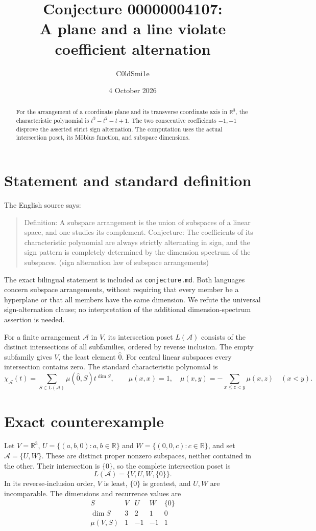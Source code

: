 \documentclass[11pt]{article}
\title{Conjecture 00000004107:\\A plane and a line violate coefficient alternation}
\author{C0ldSmi1e}
\date{4 October 2026}
\newcommand{\R}{\mathbb R}
\newcommand{\A}{\mathcal A}
\begin{document}
\maketitle
\begin{abstract}
For the arrangement of a coordinate plane and its transverse coordinate axis in $\R^3$, the characteristic polynomial is $t^3-t^2-t+1$. The two consecutive coefficients $-1,-1$ disprove the asserted strict sign alternation. The computation uses the actual intersection poset, its M\"obius function, and subspace dimensions.
\end{abstract}

\section{Statement and standard definition}
The English source says:
\begin{quote}
Definition: A subspace arrangement is the union of subspaces of a linear space, and one studies its complement. Conjecture: The coefficients of its characteristic polynomial are always strictly alternating in sign, and the sign pattern is completely determined by the dimension spectrum of the subspaces. (sign alternation law of subspace arrangements)
\end{quote}
The exact bilingual statement is included as \texttt{conjecture.md}. Both languages concern subspace arrangements, without requiring that every member be a hyperplane or that all members have the same dimension. We refute the universal sign-alternation clause; no interpretation of the additional dimension-spectrum assertion is needed.

For a finite arrangement $\A$ in $V$, its intersection poset $L(\A)$ consists of the distinct intersections of all subfamilies, ordered by reverse inclusion. The empty subfamily gives $V$, the least element $\widehat0$. For central linear subspaces every intersection contains zero. The standard characteristic polynomial is~\cite[\S\S2--3, (3.1)]{be}
\[
 \chi_{\A}(t)=\sum_{S\in L(\A)}\mu(\widehat0,S)t^{\dim S},
 \qquad
 \mu(x,x)=1,\quad \mu(x,y)=-\sum_{x\leq z<y}\mu(x,z)\quad(x<y).
\]

\section{Exact counterexample}
Let $V=\R^3$, $U=\{(a,b,0):a,b\in\R\}$ and $W=\{(0,0,c):c\in\R\}$, and set $\A=\{U,W\}$. These are distinct proper nonzero subspaces, neither contained in the other. Their intersection is $\{0\}$, so the complete intersection poset is
\[
 L(\A)=\{V,U,W,\{0\}\}.
\]
In its reverse-inclusion order, $V$ is least, $\{0\}$ is greatest, and $U,W$ are incomparable. The dimensions and recurrence values are
\[
\begin{array}{c|rrrr}
 S & V & U & W & \{0\} \\ \hline
 \dim S & 3 & 2 & 1 & 0 \\
 \mu(V,S) & 1 & -1 & -1 & 1
\end{array}
\]
\end{document}
